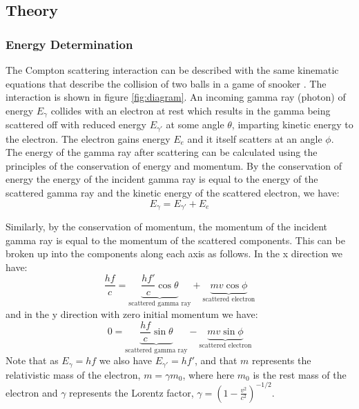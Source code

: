 \documentclass[%
reprint,
amsmath,amssymb,
aps,
floatfix
]{revtex4-2}
\begin{document}
		\subsection{Theory}
		
			\subsubsection{Energy Determination}		
			The Compton scattering interaction can be described with the same kinematic equations that describe the collision of two balls in a game of snooker \cite{manual1}. The interaction is shown in figure \ref{fig:diagram}. An incoming gamma ray (photon) of energy $E_\gamma$ collides with an electron at rest which results in the gamma being scattered off with reduced energy $E_{\gamma'}$ at some angle $\theta$, imparting kinetic energy to the electron. The electron gains energy $E_e$ and it itself scatters at an angle $\phi$.\\
			
			The energy of the gamma ray after scattering can be calculated using the principles of the conservation of energy and momentum. By the conservation of energy the energy of the incident gamma ray  is equal to the energy of the scattered gamma ray and the kinetic energy of the scattered electron, we have:
			\begin{equation}
				E_\gamma = E_{\gamma'} + E_e
			\end{equation}
			
			Similarly, by the conservation of momentum, the momentum of the incident gamma ray is equal to the momentum of the scattered components. This can be broken up into the components along each axis as follows. In the x direction we have:
			\begin{equation}
				\frac{hf}{c} = \underbrace{\frac{hf'}{c} \cos{\theta}}_\text{scattered gamma ray} + \underbrace{mv \cos{\phi}}_\text{scattered electron}
			\end{equation}and in the y direction with zero initial momentum we have:
			\begin{equation}
				0 = \underbrace{\frac{hf}{c} \sin{\theta}}_\text{scattered gamma ray} - \underbrace{mv \sin{\phi}}_\text{scattered electron}
			\end{equation}Note that as $E_\gamma = hf$ we also have $E_{\gamma'} = hf'$, and that $m$ represents the relativistic mass of the electron, $m = \gamma m_0$, where here $m_0$ is the rest mass of the electron and $\gamma$ represents the Lorentz factor, $\gamma = \left( 1 - \frac{v^2}{c^2} \right)^{-1/2}$.\\
			
\end{document}
